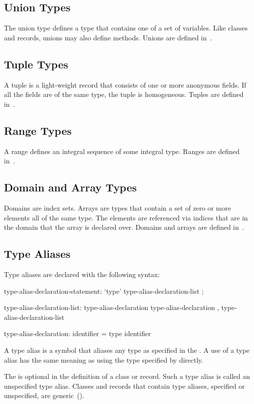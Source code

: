 \subsection{Union Types}
\label{Union_Types}

The union type defines a type that contains one of a set of variables.
Like classes and records, unions may also define methods.  Unions are
defined in~.

\subsection{Tuple Types}
\label{Tuple_Types}

A tuple is a light-weight record that consists of one or more
anonymous fields.  If all the fields are of the same type, the tuple
is homogeneous.  Tuples are defined in~.

\subsection{Range Types}

A range defines an integral sequence of some integral type.  Ranges
are defined in~.

\subsection{Domain and Array Types}
\label{Domain_and_Array_Types}

Domains are index sets.  Arrays are types that contain a set of zero
or more elements all of the same type.  The elements are referenced
via indices that are in the domain that the array is declared over.
Domains and arrays are defined in~.

\subsection{Type Aliases}
\label{Type_Aliases}

Type aliases are declared with the following syntax:
\begin{syntax}
type-alias-declaration-statement:
  `type' type-alias-declaration-list ;

type-alias-declaration-list:
  type-alias-declaration
  type-alias-declaration , type-alias-declaration-list

type-alias-declaration:
  identifier = type
  identifier
\end{syntax}
A type alias is a symbol that aliases any type as specified in the
.  A use of a type alias has the same meaning as using
the type specified by  directly.

The  is optional in the definition of a class or
record.  Such a type alias is called an unspecified type
alias. Classes and records that contain type aliases, specified or
unspecified, are generic~().

